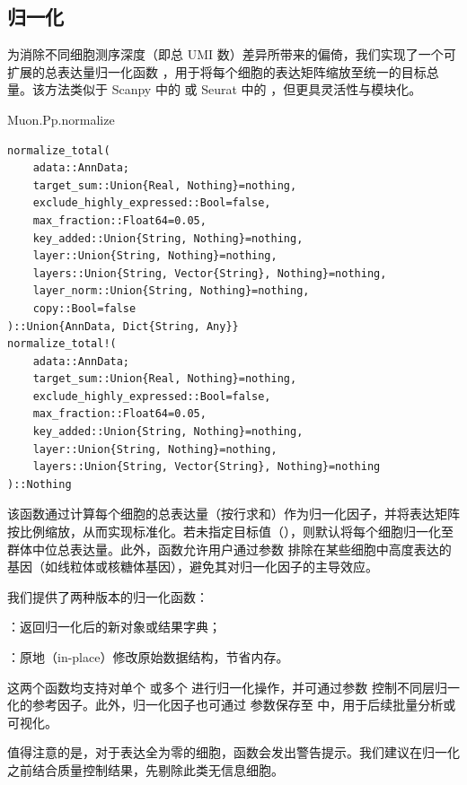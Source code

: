 \subsection{归一化}


为消除不同细胞测序深度（即总 UMI 数）差异所带来的偏倚，我们实现了一个可扩展的总表达量归一化函数 ，用于将每个细胞的表达矩阵缩放至统一的目标总量。该方法类似于 Scanpy 中的  或 Seurat 中的 ，但更具灵活性与模块化。

\begin{fancybox}{Muon.Pp.normalize}
\begin{lstlisting}
normalize_total(
    adata::AnnData;
    target_sum::Union{Real, Nothing}=nothing,
    exclude_highly_expressed::Bool=false,
    max_fraction::Float64=0.05,
    key_added::Union{String, Nothing}=nothing,
    layer::Union{String, Nothing}=nothing,
    layers::Union{String, Vector{String}, Nothing}=nothing,
    layer_norm::Union{String, Nothing}=nothing,
    copy::Bool=false
)::Union{AnnData, Dict{String, Any}}
normalize_total!(
    adata::AnnData;
    target_sum::Union{Real, Nothing}=nothing,
    exclude_highly_expressed::Bool=false,
    max_fraction::Float64=0.05,
    key_added::Union{String, Nothing}=nothing,
    layer::Union{String, Nothing}=nothing,
    layers::Union{String, Vector{String}, Nothing}=nothing
)::Nothing
\end{lstlisting}
\end{fancybox}

该函数通过计算每个细胞的总表达量（按行求和）作为归一化因子，并将表达矩阵按比例缩放，从而实现标准化。若未指定目标值（），则默认将每个细胞归一化至群体中位总表达量。此外，函数允许用户通过参数  排除在某些细胞中高度表达的基因（如线粒体或核糖体基因），避免其对归一化因子的主导效应。

我们提供了两种版本的归一化函数：

    ：返回归一化后的新对象或结果字典；

    ：原地（in-place）修改原始数据结构，节省内存。

这两个函数均支持对单个  或多个  进行归一化操作，并可通过参数  控制不同层归一化的参考因子。此外，归一化因子也可通过  参数保存至  中，用于后续批量分析或可视化。

值得注意的是，对于表达全为零的细胞，函数会发出警告提示。我们建议在归一化之前结合质量控制结果，先剔除此类无信息细胞。

